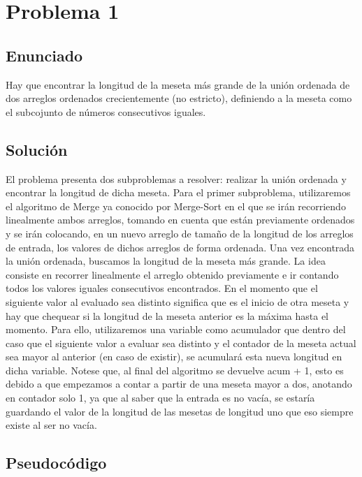 \section{Problema 1}
\subsection{Enunciado}
Hay que encontrar la longitud de la meseta más grande de la unión ordenada de dos arreglos ordenados crecientemente (no estricto),
definiendo a la meseta como el subcojunto de números consecutivos iguales.

\subsection{Soluci\'on}
El problema presenta dos subproblemas a resolver: realizar la unión ordenada y encontrar la longitud de dicha meseta.
Para el primer subproblema, utilizaremos el algoritmo de Merge ya conocido por Merge-Sort en el que se irán recorriendo linealmente ambos arreglos, tomando en cuenta que están previamente ordenados y se irán colocando, en un nuevo arreglo de tamaño de la longitud 
de los arreglos de entrada, los valores de dichos arreglos de forma ordenada.
Una vez encontrada la unión ordenada, buscamos la longitud de la meseta más grande.
La idea consiste en recorrer linealmente el arreglo obtenido previamente e ir contando todos los valores iguales consecutivos encontrados. En el momento que el siguiente valor al evaluado sea distinto significa que es el inicio de otra meseta y hay que chequear si la longitud de la meseta anterior es la máxima hasta el momento. Para ello, utilizaremos una variable como acumulador que dentro del caso que el siguiente valor a evaluar sea distinto y el contador de la meseta actual sea mayor al anterior (en caso de existir), se acumulará esta nueva longitud en dicha variable.
Notese que, al final del algoritmo se devuelve acum + 1, esto es debido a que empezamos a contar a partir de una meseta mayor a dos,
anotando en contador solo 1, 
ya que al saber que la entrada es no vacía, se estaría guardando el valor de la longitud de las mesetas de longitud uno que eso siempre existe al ser no vacía.

\subsection{Pseudoc\'odigo}

